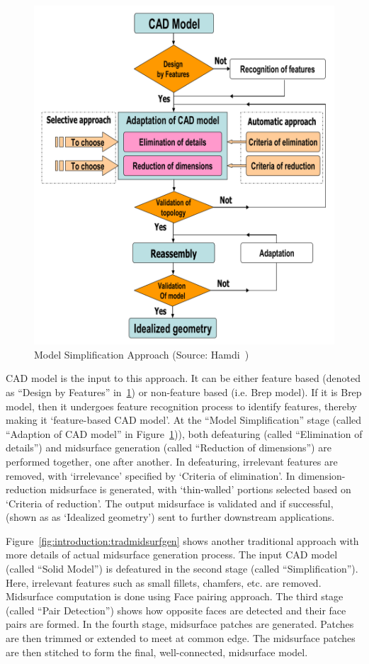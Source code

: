
	\begin{figure} [!h]
		\centering
		\includegraphics[width=0.75\linewidth]{..//Common/images/BlockDiagramSampleHamdi}
		\caption{Model Simplification Approach (Source: Hamdi~\cite{Hamdi2005})}
		\label{fig:introduction:hamdimids}
	\end{figure} 


CAD model is the input to this approach. It can be either feature based (denoted as ``Design by Features'' in~\ref{fig:introduction:hamdimids}) or non-feature based (i.e. Brep model). If it is Brep model, then it undergoes feature recognition process to identify features, thereby making it `feature-based CAD model'.  At the ``Model Simplification'' stage (called ``Adaption of CAD model'' in Figure~\ref{fig:introduction:hamdimids})), both defeaturing (called ``Elimination of details'') and midsurface generation (called ``Reduction of dimensions'') are performed together, one after another. In defeaturing, irrelevant features are removed, with `irrelevance' specified by `Criteria of elimination'. In dimension-reduction midsurface is generated, with `thin-walled' portions selected based on `Criteria of reduction'. The output midsurface is validated and if successful, (shown as as `Idealized geometry') sent to further downstream applications.

Figure~\ref{fig:introduction:tradmidsurfgen} shows another traditional approach with more details of actual midsurface generation process. The input CAD model (called ``Solid Model'') is defeatured in the second stage (called ``Simplification''). Here, irrelevant features such as small fillets, chamfers, etc. are removed. Midsurface computation is done using Face pairing approach. The  third stage (called ``Pair Detection'') shows how opposite faces are detected and their face pairs are formed. In the fourth stage, midsurface patches are generated. Patches are then trimmed or extended to meet at common edge. The midsurface patches are then stitched to form the final, well-connected, midsurface model.

